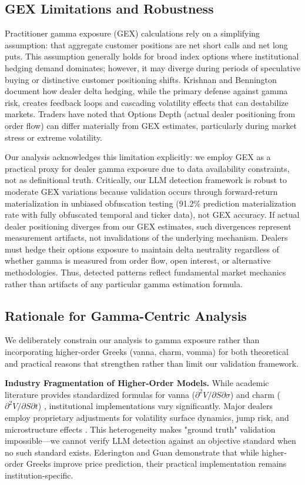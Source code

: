 \subsection{GEX Limitations and Robustness}

Practitioner gamma exposure (GEX) calculations rely on a simplifying assumption: that aggregate customer positions are net short calls and net long puts. This assumption generally holds for broad index options where institutional hedging demand dominates; however, it may diverge during periods of speculative buying or distinctive customer positioning shifts. Krishnan and Bennington \cite{krishnan2021market} document how dealer delta hedging, while the primary defense against gamma risk, creates feedback loops and cascading volatility effects that can destabilize markets. Traders have noted that Options Depth (actual dealer positioning from order flow) can differ materially from GEX estimates, particularly during market stress or extreme volatility.

Our analysis acknowledges this limitation explicitly: we employ GEX as a practical proxy for dealer gamma exposure due to data availability constraints, not as definitional truth. Critically, our LLM detection framework is robust to moderate GEX variations because validation occurs through forward-return materialization in unbiased obfuscation testing (91.2\% prediction materialization rate with fully obfuscated temporal and ticker data), not GEX accuracy. If actual dealer positioning diverges from our GEX estimates, such divergences represent measurement artifacts, not invalidations of the underlying mechanism. Dealers must hedge their options exposure to maintain delta neutrality regardless of whether gamma is measured from order flow, open interest, or alternative methodologies. Thus, detected patterns reflect fundamental market mechanics rather than artifacts of any particular gamma estimation formula.

\subsection{Rationale for Gamma-Centric Analysis}
\label{sec:gamma-focus}

We deliberately constrain our analysis to gamma exposure rather than incorporating higher-order Greeks (vanna, charm, vomma) for both theoretical and practical reasons that strengthen rather than limit our validation framework.

\textbf{Industry Fragmentation of Higher-Order Models.} While academic literature provides standardized formulas for vanna ($\partial^2V/\partial S \partial \sigma$) and charm ($\partial^2V/\partial S \partial t$) \cite{ederington2007}, institutional implementations vary significantly. Major dealers employ proprietary adjustments for volatility surface dynamics, jump risk, and microstructure effects \cite{mixon2009}. This heterogeneity makes "ground truth" validation impossible—we cannot verify LLM detection against an objective standard when no such standard exists. Ederington and Guan \cite{ederington2007} demonstrate that while higher-order Greeks improve price prediction, their practical implementation remains institution-specific.

